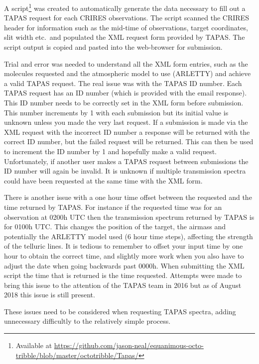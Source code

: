 A script\footnote{Available at \href{https://github.com/jason-neal/equanimous-octo-tribble/blob/master/octotribble/Tapas/}{https://github.com/jason-neal/equanimous-octo-tribble/blob/master/octotribble/Tapas/}} was created to automatically generate the data necessary to fill out a {TAPAS} request for each {CRIRES} observations.
The script scanned the {CRIRES} header for information such as the mid-time of observations, target coordinates, slit width etc.\ and populated the {XML} request form provided by {TAPAS}.
The script output is copied and pasted into the web-browser for submission.

Trial and error was needed to understand all the {XML} form entries, such as the molecules requested and the atmospheric model to use ({ARLETTY}) and achieve a valid {TAPAS} request.
The real issue was with the {TAPAS} {{ID}} number.
Each {TAPAS} request has an {ID} number (which is provided with the email response).
This {ID} number needs to be correctly set in the {XML} form before submission.
This number increments by 1 with each submission but its initial value is unknown unless you made the very last request.
If a submission is made via the {XML} request with the incorrect {ID} number a response will be returned with the correct {ID} number, but the failed request will be returned.
This can then be used to increment the {ID} number by 1 and hopefully make a valid request.
Unfortunately, if another user makes a {TAPAS} request between submissions the {ID} number will again be invalid.
It is unknown if multiple transmission spectra could have been requested at the same time with the {XML} form.

There is another issue with a one hour time offset between the requested and the time returned by {TAPAS}.
For instance if the requested time was for an observation at 0200h {UTC} then the transmission spectrum returned by {TAPAS} is for 0100h {UTC}.
This changes the position of the target, the airmass and potentially the {ARLETTY} model used (6 hour time steps), affecting the strength of the telluric lines.
It is tedious to remember to offset your input time by one hour to obtain the correct time, and slightly more work when you also have to adjust the date when going backwards past 0000h.
When submitting the {XML} script the time that is returned is the time requested.
Attempts were made to bring this issue to the attention of the {TAPAS} team in 2016 but as of August 2018 this issue is still present.

These issues need to be considered when requesting {TAPAS} spectra, adding unnecessary difficultly to the relatively simple process.


